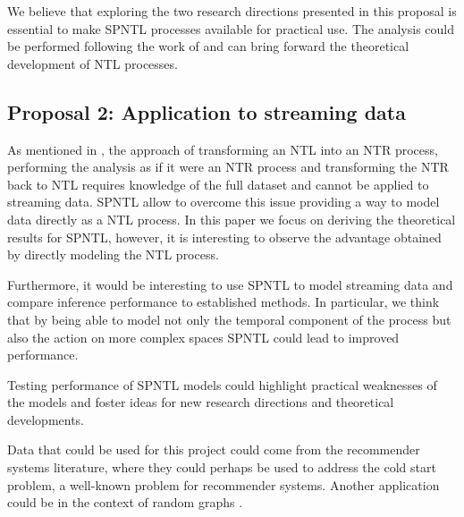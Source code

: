 We believe that exploring the two research directions presented in this proposal is essential to make SPNTL processes available for practical use. The analysis could be performed following the work of \cite{james2006poisson} and can bring forward the theoretical development of NTL processes.

\subsection{Proposal 2: Application to streaming data} %
As mentioned in , the approach of transforming an NTL into an NTR process, performing the analysis as if it were an NTR process and transforming the NTR back to NTL requires knowledge of the full dataset and cannot be applied to streaming data. SPNTL allow to overcome this issue providing a way to model data directly as a NTL process. In this paper we focus on deriving the theoretical results for SPNTL, however, it is interesting to observe the advantage obtained by directly modeling the NTL process. 

Furthermore, it would be interesting to use SPNTL to model streaming data and compare inference performance to established methods. In particular, we think that by being able to model not only the temporal component of the process but also the action on more complex spaces SPNTL could lead to improved performance.

Testing performance of SPNTL models could highlight practical weaknesses of the models and foster ideas for new research directions and theoretical developments.

Data that could be used for this project could come from the recommender systems literature, where they could perhaps be used to address the cold start problem, a well-known problem for recommender systems. Another application could be in the context of random graphs \cite{bloem2017preferential,bloem2018sampling}. 
